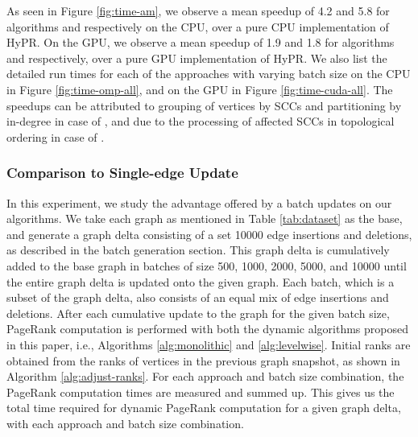 As seen in Figure \ref{fig:time-am}, we observe a mean speedup of {4.2\x} and {5.8\x} for algorithms \monolithicPR{} and \levelwisePR{} respectively on the CPU, over a pure CPU implementation of HyPR. On the GPU, we observe a mean speedup of {1.9\x} and {1.8\x} for algorithms \monolithicPR{} and \levelwisePR{} respectively, over a pure GPU implementation of HyPR. We also list the detailed run times for each of the approaches with varying batch size on the CPU in Figure \ref{fig:time-omp-all}, and on the GPU in Figure \ref{fig:time-cuda-all}. The speedups can be attributed to grouping of vertices by SCCs and partitioning by in-degree in case of \monolithicPR{}, and due to the processing of affected SCCs in topological ordering in case of \levelwisePR{}.




\subsubsection{\bf Comparison to Single-edge Update}

In this experiment, we study the advantage offered by a batch updates on our algorithms. We take each graph as mentioned in Table \ref{tab:dataset} as the base, and generate a graph delta consisting of a set 10000 edge insertions and deletions, as described in the batch generation section. This graph delta is cumulatively added to the base graph in batches of size 500, 1000, 2000, 5000, and 10000 until the entire graph delta is updated onto the given graph. Each batch, which is a subset of the graph delta, also consists of an equal mix of edge insertions and deletions. After each cumulative update to the graph for the given batch size, PageRank computation is performed with both the dynamic algorithms proposed in this paper, i.e., Algorithms \ref{alg:monolithic} and \ref{alg:levelwise}. Initial ranks are obtained from the ranks of vertices in the previous graph snapshot, as shown in Algorithm \ref{alg:adjust-ranks}. For each approach and batch size combination, the PageRank computation times are measured and summed up. This gives us the total time required for dynamic PageRank computation for a given graph delta, with each approach and batch size combination.

